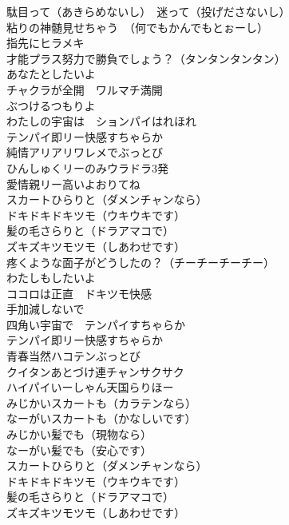 {駄目って（あきらめないし）　迷って（投げださないし）\\
粘りの神髄見せちゃう　（何でもかんでもとぉーし）\\

指先にヒラメキ\\
才能プラス努力で勝負でしょう？（タンタンタンタン）\\

あなたとしたいよ\\
チャクラが全開　ワルマチ満開\\
ぶつけるつもりよ\\
わたしの宇宙は　ションパイはれほれ\\

テンパイ即リー快感すちゃらか\\
純情アリアリワレメでぶっとび\\
ひんしゅくリーのみウラドラ3発\\
愛情親リー高いよおりてね\\

スカートひらりと（ダメンチャンなら）\\
ドキドキドキツモ（ウキウキです）\\
髪の毛さらりと（ドラアマコで）\\
ズキズキツモツモ（しあわせです）\\

疼くような面子がどうしたの？（チーチーチーチー）\\

わたしもしたいよ\\
ココロは正直　ドキツモ快感\\
手加減しないで\\
四角い宇宙で　テンパイすちゃらか\\

テンパイ即リー快感すちゃらか\\
青春当然ハコテンぶっとび\\
クイタンあとづけ連チャンサクサク\\
ハイパイいーしゃん天国らりほー\\

みじかいスカートも（カラテンなら）\\
なーがいスカートも（かなしいです）\\
みじかい髪でも（現物なら）\\
なーがい髪でも（安心です）\\

スカートひらりと（ダメンチャンなら）\\
ドキドキドキツモ（ウキウキです）\\
髪の毛さらりと（ドラアマコで）\\
ズキズキツモツモ（しあわせです）
}
